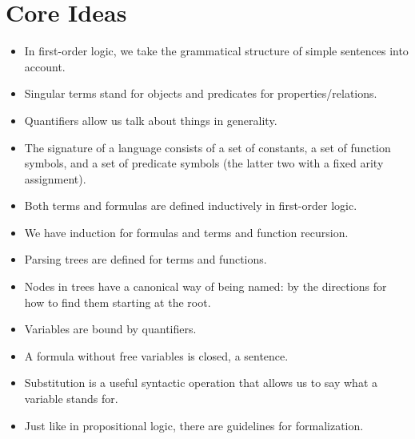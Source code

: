 
\section{Core Ideas}

	\begin{itemize}
	
		\item In first-order logic, we take the grammatical structure of simple sentences into account.
		
		\item  Singular terms stand for objects and predicates for properties/relations.
		
		\item Quantifiers allow us talk about things in generality.
		
		\item The signature of a language consists of a set of constants, a set of function symbols, and a set of predicate symbols (the latter two with a fixed arity assignment).
		
		\item Both terms and formulas are defined inductively in first-order logic.
		
		\item We have induction for formulas and terms and function recursion.
		
		\item Parsing trees are defined for terms and functions.
		
		\item Nodes in trees have a canonical way of being named: by the directions for how to find them starting at the root. 
		
		\item Variables are bound by quantifiers.
		
		\item A formula without free variables is closed, a
                  sentence.

                  \item Substitution is a useful syntactic operation
                    that allows us to say what a variable stands for.
		
		\item Just like in propositional logic, there are guidelines for formalization.
					
	\end{itemize}

